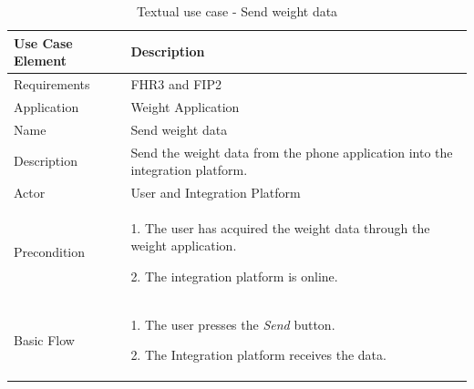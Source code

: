 \begin{table}[h]
\begin{center}
\begin{tabular}{ l | p{10cm} }
  \hline
  \textbf{Use Case Element} & \textbf{Description} \\ \hline\hline
  Requirements & FHR3 and FIP2\\ \hline
  Application & Weight Application \\ \hline
  Name & Send weight data \\ \hline
  Description & Send the weight data from the phone application into the integration platform. \\ \hline
  Actor & User and Integration Platform \\ \hline
  Precondition &
    \par 1. The user has acquired the weight data through the weight application.
    \par 2. The integration platform is online.
  \\ \hline
  Basic Flow & 
  	\par 1. The user presses the \textit{Send} button.
  	\par 2. The Integration platform receives the data.
  \\ \hline
\end{tabular}
\end{center}
\caption{Textual use case - Send weight data}
\label{table:use-case-send-weight-data}
\end{table}

